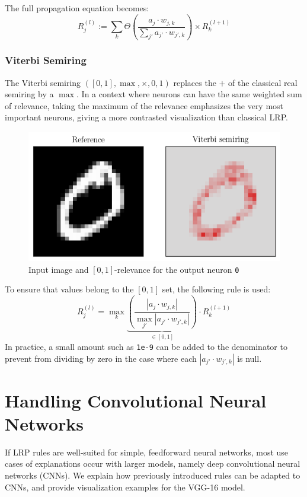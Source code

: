 \documentclass{../cs-classes/cs-classes}
\newcommand*{\1}{\digitsbb{1}}
\newcommand*{\0}{\digitsbb{0}}
\begin{document}
The full propagation equation becomes:
\begin{equation}
    R^{(l)}_j := \sum_{k}\Theta\left(\frac{a_j\cdot w_{j, k}}{\sum_{j'}a_{j'}\cdot w_{j', k}}\right) \times R^{(l+1)}_k
    \label{eq:counting-lrp}
\end{equation}

\subsubsection{Viterbi Semiring}
The Viterbi semiring $([0, 1], \max, \times, 0, 1)$ replaces the $+$ of the classical real semiring by a $\max$. In a context where neurons can have the same weighted sum of relevance, taking the maximum of the relevance emphasizes the very most important neurons, giving a more contrasted visualization than classical LRP. 
\begin{figure}[H]
    \centering
    \includegraphics[width=.5\textwidth]{viterbi.png}
    \caption{Input image and $[0, 1]$-relevance for the output neuron \texttt{0}}
\end{figure}
To ensure that values belong to the $[0, 1]$ set, the following rule is used:
\begin{equation}
    R^{(l)}_j = \max_k \underbrace{\left(\frac{\left|a_j\cdot w_{j, k}\right|}{\max_{j'} \left|a_{j'}\cdot w_{j', k}\right|}\right)}_{\in[0, 1]} \cdot R^{(l+1)}_k
\end{equation}
In practice, a small amount such as \texttt{1e-9} can be added to the denominator to prevent from dividing by zero in the case where each $|a_{j'}\cdot w_{j',k}|$ is null.

\section{Handling Convolutional Neural Networks}
If LRP rules are well-suited for simple, feedforward neural networks, most use cases of explanations occur with larger models, namely deep convolutional neural networks (CNNs). We explain how previously introduced rules can be adapted to CNNs, and provide visualization examples for the VGG-16 model.
\end{document}
